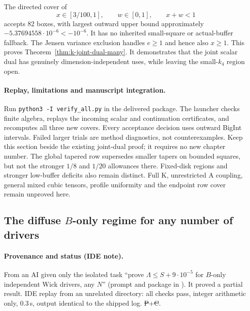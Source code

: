 The directed cover of
\[
 x\in[3/100,1],\qquad w\in[0,1],\qquad x+w<1
\]
accepts 82 boxes, with largest outward upper bound approximately
$-5.37694558\cdot10^{-6}<-10^{-6}$. It has no inherited
small-square or actual-buffer fallback. The Jensen variance exclusion
handles $e\ge1$ and hence also $x\ge1$.
This proves Theorem~\ref{thm:k-joint-dual-many}.
It demonstrates that the joint scalar dual has genuinely
dimension-independent uses, while leaving the small-$k_4$ region open.

\paragraph{Replay, limitations and manuscript integration.}
Run \texttt{python3 -I verify\_all.py} in the delivered package.
The launcher checks finite algebra, replays the incoming scalar and
continuation certificates, and recomputes all three new covers.
Every acceptance decision uses outward BigInt intervals.
Failed larger trials are method diagnostics, not counterexamples.
Keep this section beside the existing joint-dual proof; it requires no
new chapter number. The global tapered row supersedes smaller tapers
on bounded squares, but not the stronger $1/8$ and $1/20$ allowances
there. Fixed-disk regions and stronger low-buffer deficits also remain
distinct. Full K, unrestricted A coupling, general mixed cubic tensors,
profile uniformity and the endpoint row cover remain unproved here.

\subsection{The diffuse $B$-only regime for any number of drivers}\label{sec:bonly-diffuse}
\paragraph{Provenance and status (IDE note).} From an AI given only the isolated task ``prove $\Lambda\le S+9\cdot10^{-5}$ for $B$-only independent Wick drivers, any
$N$'' (prompt and package in ). It proved a partial result. IDE replay  from an unrelated
directory: all checks pass, integer arithmetic only, 0.3\,s, output identical to the shipped log. \st{P}+\st{C}.

